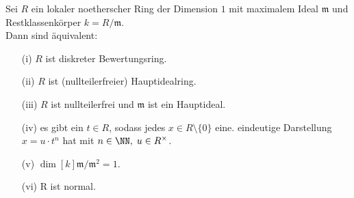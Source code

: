 \begin{Satz} 
\label{Satz12}
Sei $R$ ein lokaler noetherscher Ring der Dimension $1$ mit maximalem Ideal
$\mathfrak{m}$ und Restklassenkörper $k = R/\mathfrak{m}$.\\
Dann sind äquivalent:
\begin{enumerate}
  \item[(i)] $R$ ist diskreter Bewertungsring.
  \item[(ii)] $R$ ist (nullteilerfreier) Hauptidealring.
  \item[(iii)] $R$ ist nullteilerfrei und $\mathfrak{m}$ ist ein Hauptideal.
  \item[(iv)] es gibt ein $t \in R$, sodass jedes $x \in R \setminus \{0\}$ eine.
  eindeutige Darstellung $x=u \cdot t^n$ hat mit $n \in \NN, \; u \in
  R^{\times}$.
  \item[(v)] $\dim[k]{\mathfrak{m}/\mathfrak{m}^2} = 1$.
  \item[(vi)] R ist normal.
\end{enumerate}
\end{Satz}

